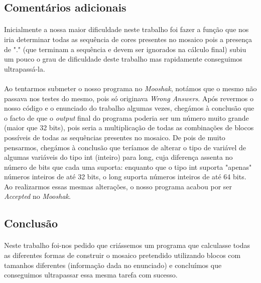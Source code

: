 \documentclass[12pt]{article}
\begin{document}
\newpage
\begin{center}
\section{Comentários adicionais}
\end{center}
\paragraph{}
Inicialmente a nossa maior dificuldade neste trabalho foi fazer a função que nos iria determinar todas as sequência de cores presentes no mosaico pois a presença de "." (que terminam a sequência e devem ser ignorados na cálculo final) subiu um pouco o grau de dificuldade deste trabalho mas rapidamente conseguimos ultrapassá-la.
\paragraph{}
Ao tentarmos submeter o nosso programa no \textit{Mooshak}, notámos que o mesmo não passava nos testes do mesmo, pois só originava \textit{Wrong Answers}. Após revermos o nosso código e o enunciado do trabalho algumas vezes, chegámos à conclusão que o facto de que o \textit{output} final do programa poderia ser um número muito grande (maior que 32 bits), pois seria a multiplicação de todas as combinações de blocos possíveis de todas as sequências presentes no mosaico. De pois de muito pensarmos, chegámos à conclusão que teríamos de alterar o tipo de variável de algumas variáveis do tipo int (inteiro) para long, cuja diferença assenta no número de bits que cada uma suporta: enquanto que o tipo int suporta "apenas" números inteiros de até 32 bits, o long suporta números inteiros de até 64 bits. Ao realizarmos essas mesmas alterações, o nosso programa acabou por ser \textit{Accepted} no \textit{Mooshak}.

\newpage
\begin{center}
\section{Conclusão}
\end{center}
\paragraph{}
Neste trabalho foi-nos pedido que criássemos um programa que calculasse todas as diferentes formas de construir o mosaico pretendido utilizando blocos com tamanhos diferentes (informação dada no enunciado) e concluímos que conseguimos ultrapassar essa mesma tarefa com sucesso.
\end{document}
